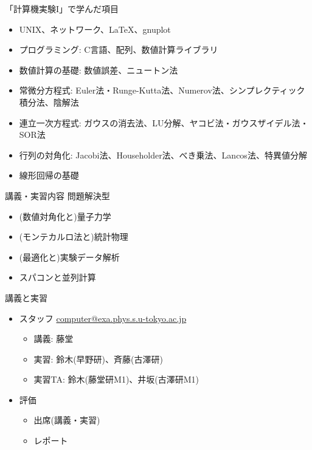 \begin{frame}[t]{「計算機実験I」で学んだ項目}
  \begin{itemize}
  \item UNIX、ネットワーク、\LaTeX、gnuplot
  \item プログラミング: C言語、配列、数値計算ライブラリ
  \item 数値計算の基礎: 数値誤差、ニュートン法
  \item 常微分方程式: Euler法・Runge-Kutta法、Numerov法、シンプレクティック積分法、陰解法
  \item 連立一次方程式: ガウスの消去法、LU分解、ヤコビ法・ガウスザイデル法・SOR法
  \item 行列の対角化: Jacobi法、Householder法、べき乗法、Lancos法、特異値分解
  \item 線形回帰の基礎
  \end{itemize}
\end{frame}

\begin{frame}[t]{講義・実習内容}
  問題解決型
  \begin{itemize}
    \setlength{\itemsep}{1em}
  \item (数値対角化と)量子力学
  \item (モンテカルロ法と)統計物理
  \item (最適化と)実験データ解析
  \item スパコンと並列計算
  \end{itemize}
\end{frame}

\begin{frame}[t,fragile]{講義と実習}
  \begin{itemize}
    \setlength{\itemsep}{1em}
  \item スタッフ \href{mailto:computer@exa.phys.s.u-tokyo.ac.jp}{computer@exa.phys.s.u-tokyo.ac.jp}
    \begin{itemize}
    \item 講義: 藤堂
    \item 実習: 鈴木(早野研)、斉藤(古澤研)
    \item 実習TA: 鈴木(藤堂研M1)、井坂(古澤研M1)
    \end{itemize}
  \item 評価
    \begin{itemize}
    \item 出席(講義・実習)
    \item レポート
    \end{itemize}    
  \end{itemize}    
\end{frame}

